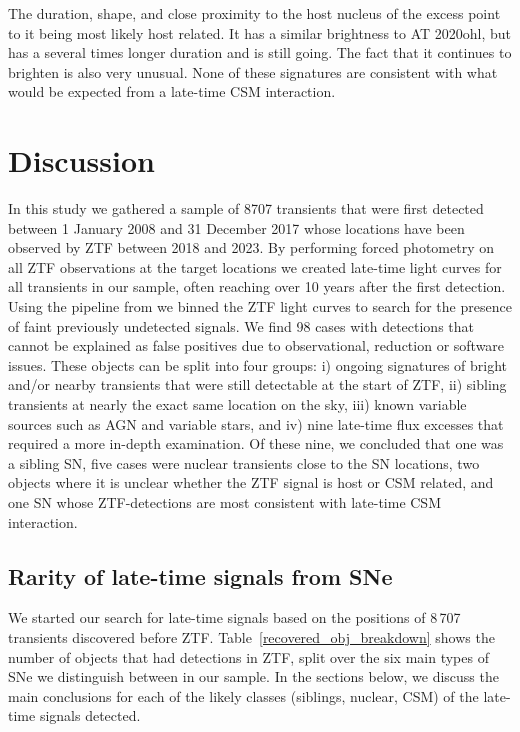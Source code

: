 \documentclass[a4paper,oneside,12pt, class=Latex/Classes/PhDthesisPSnPDF, crop=false]{standalone}
\begin{document}
The duration, shape, and close proximity to the host nucleus of the excess point to it being most likely host related. It has a similar brightness to AT 2020ohl, but has a several times longer duration and is still going. The fact that it continues to brighten is also very unusual. None of these signatures are consistent with what would be expected from a late-time CSM interaction.


\section{Discussion}
\label{Pre-ZTF_discussion}
In this study we gathered a sample of 8707 transients that were first detected between 1 January 2008 and 31 December 2017 whose locations have been observed by ZTF between 2018 and 2023. By performing forced photometry on all ZTF observations at the target locations we created late-time light curves for all transients in our sample, often reaching over 10 years after the first detection. Using the pipeline from \citet{Terwel_2024_paper1} we binned the ZTF light curves to search for the presence of faint previously undetected signals. We find 98 cases with detections that cannot be explained as false positives due to observational, reduction or software issues. These objects can be split into four groups: i) ongoing signatures of bright and/or nearby transients that were still detectable at the start of ZTF, ii) sibling transients at nearly the exact same location on the sky, iii) known variable sources such as AGN and variable stars, and iv) nine late-time flux excesses that required a more in-depth examination. Of these nine, we concluded that one was a sibling SN, five cases were nuclear transients close to the SN locations, two objects where it is unclear whether the ZTF signal is host or CSM related, and one SN whose ZTF-detections are most consistent with late-time CSM interaction.


\subsection{Rarity of late-time signals from SNe}
We started our search for late-time signals based on the positions of 8\,707 transients discovered before ZTF. Table~\ref{recovered_obj_breakdown} shows the number of objects that had detections in ZTF, split over the six main types of SNe we distinguish between in our sample. In the sections below, we discuss the main conclusions for each of the likely classes (siblings, nuclear, CSM) of the late-time signals detected.
\end{document}
